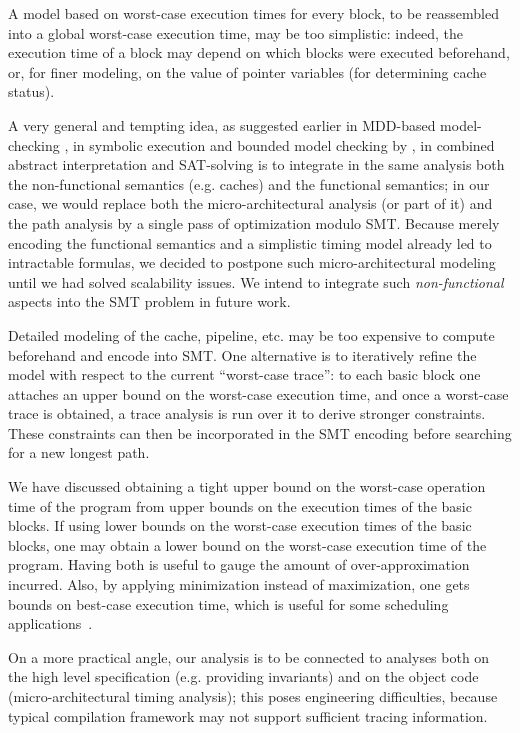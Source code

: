 \documentclass[a4paper,twocolumn,11pt]{article}
\begin{document}
A model based on worst-case execution times for every block, to be reassembled into a global worst-case execution time, may be too simplistic: indeed, the execution time of a block may depend on which blocks were executed beforehand, or, for finer modeling, on the value of pointer variables (for determining cache status).

A very general and tempting idea, as suggested earlier in MDD-based model-checking \parencite{metzner-CAV04}, in symbolic execution and bounded model checking by \parencite{DBLP:journals/rts/ChattopadhyayR13,Chu_Jaffar_EMSOFT2011}, in combined abstract interpretation and SAT-solving \parencite{DBLP:conf/rtas/BanerjeeCR13} is to integrate in the same analysis both the non-functional semantics (e.g. caches) and the functional semantics; in our case, we would replace both the micro-architectural analysis (or part of it) and the path analysis by a single pass of optimization modulo SMT.
Because merely encoding the functional semantics and a simplistic timing model already led to intractable formulas, we decided to postpone such micro-architectural modeling until we had solved scalability issues.
We intend to integrate such \emph{non-functional} aspects into the SMT problem in future work.

Detailed modeling of the cache, pipeline, etc. may be too expensive to compute beforehand and encode into SMT. One alternative is to iteratively refine the model with respect to the current ``worst-case trace'': to each basic block one attaches an upper bound on the worst-case execution time, and once a worst-case trace is obtained, a trace analysis is run over it to derive stronger constraints. These constraints can then be incorporated in the SMT encoding before searching for a new longest path.

We have discussed obtaining a tight upper bound on the worst-case operation time of the program from upper bounds on the execution times of the basic blocks. If using lower bounds on the worst-case execution times of the basic blocks, one may obtain a lower bound on the worst-case execution time of the program. Having both is useful to gauge the amount of over-approximation incurred. Also, by applying minimization instead of maximization, one gets bounds on best-case execution time, which is useful for some scheduling applications~\parencite{Wilhelm06}.

On a more practical angle, our analysis is to be connected to analyses both on the high level specification (e.g. providing invariants) and on the object code (micro-architectural timing analysis); this poses engineering difficulties, because typical compilation framework may not support sufficient tracing information.
\end{document}
